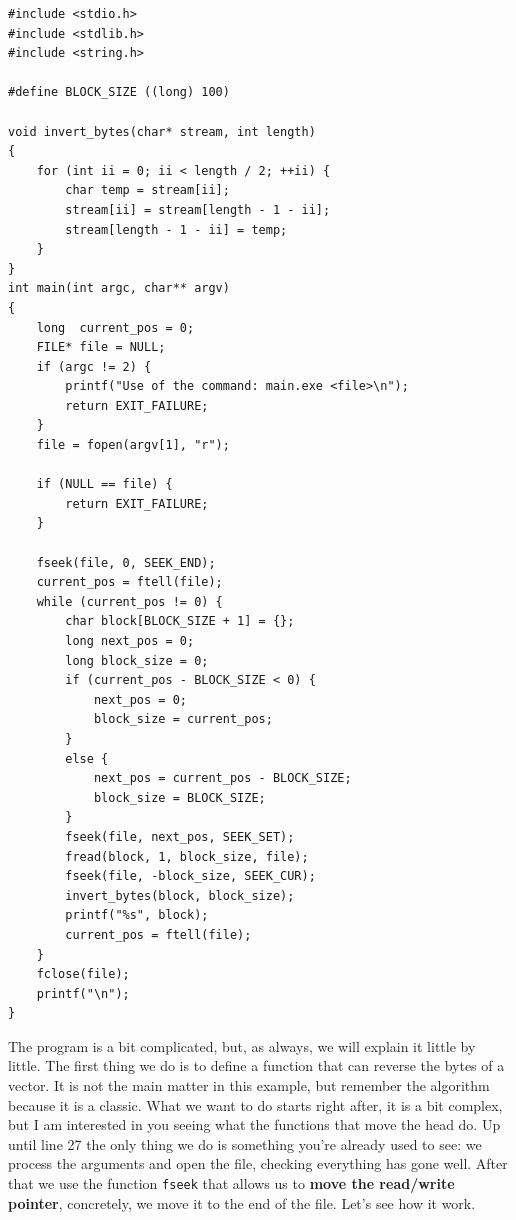 \documentclass[a4paper]{article}
\begin{document}
\noindent
\begin{minipage}[H]{\linewidth}
\mbox{}
\begin{lstlisting}[style=C,
caption={Example of use of functions to move the read/write pointer},
label={lst:fseek}]
#include <stdio.h>
#include <stdlib.h>
#include <string.h>

#define BLOCK_SIZE ((long) 100)

void invert_bytes(char* stream, int length)
{
    for (int ii = 0; ii < length / 2; ++ii) {
        char temp = stream[ii];
        stream[ii] = stream[length - 1 - ii];
        stream[length - 1 - ii] = temp;
    }
}
int main(int argc, char** argv)
{
    long  current_pos = 0;
    FILE* file = NULL;
    if (argc != 2) {
        printf("Use of the command: main.exe <file>\n");
        return EXIT_FAILURE;
    }
    file = fopen(argv[1], "r");

    if (NULL == file) {
        return EXIT_FAILURE;
    }

    fseek(file, 0, SEEK_END);
    current_pos = ftell(file);
    while (current_pos != 0) {
        char block[BLOCK_SIZE + 1] = {};
        long next_pos = 0;
        long block_size = 0;
        if (current_pos - BLOCK_SIZE < 0) {
            next_pos = 0;
            block_size = current_pos;
        }
        else {
            next_pos = current_pos - BLOCK_SIZE;
            block_size = BLOCK_SIZE;
        }
        fseek(file, next_pos, SEEK_SET);
        fread(block, 1, block_size, file);
        fseek(file, -block_size, SEEK_CUR);
        invert_bytes(block, block_size);
        printf("%s", block);
        current_pos = ftell(file);
    }
    fclose(file);
    printf("\n");
}
\end{lstlisting}
\end{minipage}

The program is a bit complicated, but, as always, we will explain it little
by little. The first thing we do is to define a function that can reverse the
bytes of a vector. It is not the main matter in this example, but remember the
algorithm because it is a classic. What we want to do starts right after, it is
a bit complex, but I am interested in you seeing what the functions that move
the head do. Up until line 27 the only thing we do is something you're already
used to see: we process the arguments and open the file, checking everything has
gone well. After that we use the function \verb!fseek! that allows us to
\textbf{move the read/write pointer}, concretely, we move it to the end of the
file. Let's see how it work.
\end{document}
